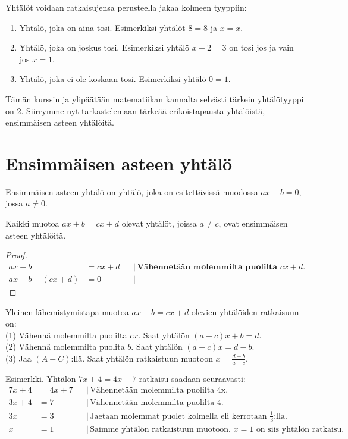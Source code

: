 Yhtälöt voidaan ratkaisujensa perusteella jakaa kolmeen tyyppiin:
\begin{enumerate}
\item Yhtälö, joka on aina tosi. Esimerkiksi yhtälöt $8=8$ ja $x=x$.
\item Yhtälö, joka on joskus tosi. Esimerkiksi yhtälö $x+2=3$ on tosi jos ja vain jos $x=1$.
\item Yhtälö, joka ei ole koskaan tosi. Esimerkiksi yhtälö $0=1$.
\end{enumerate}
Tämän kurssin ja ylipäätään matematiikan kannalta selvästi tärkein yhtälötyyppi on 2. Siirrymme nyt tarkastelemaan tärkeää erikoistapausta yhtälöistä, ensimmäisen asteen yhtälöitä.

\chapter{Ensimmäisen asteen yhtälö}
Ensimmäisen asteen yhtälö on yhtälö, joka on esitettävissä muodossa $ax+b=0$, jossa $a \neq 0$.

\begin{theorem}
Kaikki muotoa $ax+b=cx+d$ olevat yhtälöt, joissa $a \neq c$, ovat ensimmäisen asteen yhtälöitä.
\end{theorem}

\begin{proof}
\begin{align*}
ax+b &= cx+d & &| \, \textbf{Vähennetään molemmilta puolilta $cx+d$.} \\
ax+b - (cx+d) &= 0 & &| \, 
\end{align*}
\end{proof}

\begin{theorem}
Yleinen lähemistymistapa muotoa $ax+b = cx+d$ olevien yhtälöiden ratkaisuun on: \\
(1) Vähennä molemmilta puolilta $cx$. Saat yhtälön $(a-c)x + b = d$. \\
(2) Vähennä molemmilta puolita $b$. Saat yhtälön $(a-c)x = d-b$. \\
(3) Jaa $(A-C)$:llä. Saat yhtälön ratkaistuun muotoon $x = \frac{d-b}{a-c}$.
\end{theorem}

Esimerkki. Yhtälön $7x+4=4x+7$ ratkaisu saadaan seuraavasti:
\begin{align*}
7x+4 &= 4x+7 & &| \, \text{Vähennetään molemmilta puolilta 4x.} \\
3x+4 &= 7 & &| \, \text{Vähennetään molemmilta puolilta 4.} \\
3x &= 3 & &| \, \text{Jaetaan molemmat puolet kolmella eli kerrotaan $\frac{1}{3}$:lla.} \\
x &= 1 & &| \, \text{Saimme yhtälön ratkaistuun muotoon. $x=1$ on siis yhtälön ratkaisu.} \\
\end{align*}

